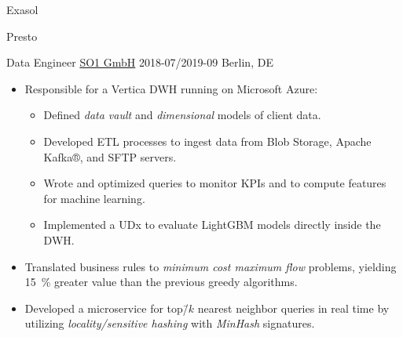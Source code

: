 \documentclass[10pt,letterpaper]{article}%
\begin{document}
\begin{minipage}[t]{0.575\textwidth}
{\begin{adjustbox}{valign=m,minipage=.15\linewidth,margin=0 0 0 14pt}
      \begin{tcolorbox}[remember as=Exasol,width=\linewidth]
        Exasol
      \end{tcolorbox}%
      \newline%
      \begin{tcolorbox}[remember as=Presto,width=\linewidth]
        Presto
      \end{tcolorbox}%
    \end{adjustbox}%
    \medskip
  }

  \WorkEntry%
  {Data Engineer}%
  {\href{https://www.so1.ai/en/}{SO1 GmbH}}%
  {2018-07/2019-09}%
  {Berlin, DE}%
  {%
    \begin{itemize}[nosep,leftmargin=*]
    \item Responsible for a Vertica DWH running on Microsoft Azure:
      \begin{itemize}[nosep]
      \item Defined \emph{data vault} and \emph{dimensional} models of client
        data.
      \item Developed ETL processes to ingest data from Blob Storage, Apache
        Kafka®, and SFTP servers.
      \item Wrote and optimized queries to monitor KPIs and to compute features
        for machine learning.
      \item Implemented a UDx to evaluate LightGBM models directly inside the
        DWH.
      \end{itemize}
    \item Translated business rules to \emph{minimum cost maximum flow}
      problems, yielding \SI{15}{\percent} greater value than the previous
      greedy algorithms.
    \item Developed a microservice for top\=/\(k\) nearest neighbor queries in
      real time by utilizing \emph{locality\-/sensitive hashing} with
      \emph{MinHash} signatures.
    \end{itemize}
  }


\end{minipage}
\end{document}
